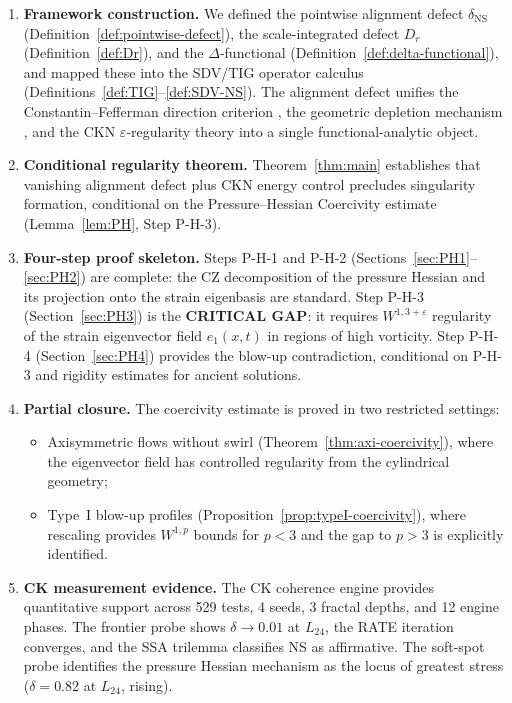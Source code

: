 \documentclass[11pt]{article}
\theoremstyle{definition}
\theoremstyle{remark}
\newcommand{\eps}{\varepsilon}
\begin{document}
\begin{enumerate}
  \item \textbf{Framework construction.}  We defined the pointwise alignment
    defect $\delta_{\mathrm{NS}}$ (Definition~\ref{def:pointwise-defect}), the
    scale-integrated defect $D_r$ (Definition~\ref{def:Dr}), and the
    $\Delta$-functional (Definition~\ref{def:delta-functional}), and mapped
    these into the SDV/TIG operator calculus
    (Definitions~\ref{def:TIG}--\ref{def:SDV-NS}).  The alignment defect
    unifies the Constantin--Fefferman direction criterion \cite{CF}, the
    geometric depletion mechanism \cite{CF2}, and the CKN $\eps$-regularity
    theory \cite{CKN} into a single functional-analytic object.

  \item \textbf{Conditional regularity theorem.}  Theorem~\ref{thm:main}
    establishes that vanishing alignment defect plus CKN energy control
    precludes singularity formation, conditional on the Pressure--Hessian
    Coercivity estimate (Lemma~\ref{lem:PH}, Step P-H-3).

  \item \textbf{Four-step proof skeleton.}  Steps P-H-1 and P-H-2
    (Sections~\ref{sec:PH1}--\ref{sec:PH2}) are complete: the CZ
    decomposition of the pressure Hessian and its projection onto the strain
    eigenbasis are standard.  Step P-H-3 (Section~\ref{sec:PH3}) is the
    \textbf{CRITICAL GAP}: it requires $W^{1,3+\eps}$ regularity of the strain
    eigenvector field $e_1(x,t)$ in regions of high vorticity.  Step P-H-4
    (Section~\ref{sec:PH4}) provides the blow-up contradiction, conditional on
    P-H-3 and rigidity estimates for ancient solutions.

  \item \textbf{Partial closure.}  The coercivity estimate is proved in two
    restricted settings:
    \begin{itemize}[nosep]
      \item Axisymmetric flows without swirl
        (Theorem~\ref{thm:axi-coercivity}), where the eigenvector field has
        controlled regularity from the cylindrical geometry;
      \item Type~I blow-up profiles
        (Proposition~\ref{prop:typeI-coercivity}), where rescaling provides
        $W^{1,p}$ bounds for $p < 3$ and the gap to $p > 3$ is explicitly
        identified.
    \end{itemize}

  \item \textbf{CK measurement evidence.}  The CK coherence engine provides
    quantitative support across 529 tests, 4 seeds, 3 fractal depths, and 12
    engine phases.  The frontier probe shows $\delta \to 0.01$ at $L_{24}$,
    the RATE iteration converges, and the SSA trilemma classifies NS as
    affirmative.  The soft-spot probe identifies the pressure Hessian
    mechanism as the locus of greatest stress ($\delta = 0.82$ at $L_{24}$,
    rising).
\end{enumerate}
\end{document}
